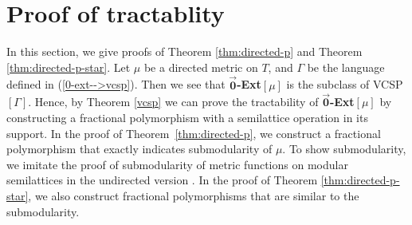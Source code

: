 \documentclass[11pt]{article}
\theoremstyle{definition}
\begin{document}
\section{Proof of tractablity}
\label{sec:proof of tractability}
In this section, we give proofs of Theorem \ref{thm:directed-p} and Theorem \ref{thm:directed-p-star}. Let $\mu$ be a directed metric on $T$, and $\Gamma$ be the language defined in (\ref{0-ext-->vcsp}). Then we see that $\overrightarrow{\textbf{0}}$\textbf{-Ext}$[\mu]$ is the subclass of VCSP$[\Gamma]$. Hence, by Theorem \ref{vcsp} we can prove the tractability of $\overrightarrow{\textbf{0}}$\textbf{-Ext}$[\mu]$ by constructing a fractional polymorphism with a semilattice operation in its support. In the proof of Theorem~\ref{thm:directed-p}, we construct a fractional polymorphism that exactly indicates submodularity of $\mu$. To show submodularity, we imitate the proof of submodularity of metric functions on modular semilattices in the undirected version \cite{hirai2016}. In the proof of Theorem \ref{thm:directed-p-star}, we also construct fractional polymorphisms that are similar to the submodularity.
\end{document}
